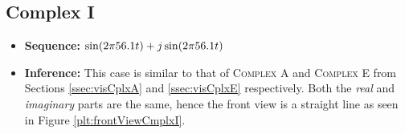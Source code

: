\documentclass[../../course]{subfiles}
\begin{document}
\subsection{Complex I} \label{ssec:visCplxI}

\begin{itemize} [label=]

    \item \textbf{Sequence:} $\sin(2 \pi 56.1 t) + j \sin(2 \pi 56.1 t)$

    \item \textbf{Inference:} This case is similar to that of \textsc{Complex A} and
        \textsc{Complex E} from Sections \ref{ssec:visCplxA} and \ref{ssec:visCplxE}
        respectively. Both the \emph{real} and \emph{imaginary} parts are the same,
        hence the front view is a straight line as seen in Figure \ref{plt:frontViewCmplxI}.

\end{itemize}

\vfill
\end{document}
